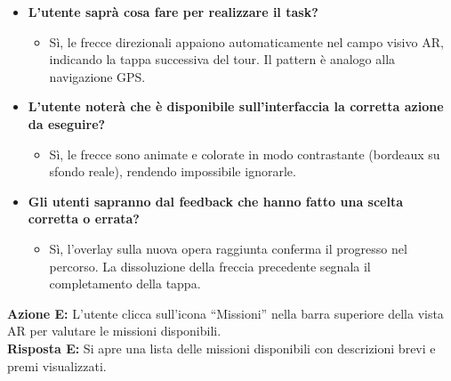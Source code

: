 \begin{itemize}[nosep, leftmargin=1.6em]
    \item \textbf{L'utente saprà cosa fare per realizzare il task?}
    \begin{itemize}[nosep, leftmargin=1.6em]
        \item Sì, le frecce direzionali appaiono automaticamente nel campo visivo AR, indicando la tappa successiva del tour. Il pattern è analogo alla navigazione GPS.
    \end{itemize}
    \item \textbf{L'utente noterà che è disponibile sull'interfaccia la corretta azione da eseguire?}
    \begin{itemize}[nosep, leftmargin=1.6em]
        \item Sì, le frecce sono animate e colorate in modo contrastante (bordeaux su sfondo reale), rendendo impossibile ignorarle.
    \end{itemize}
    \item \textbf{Gli utenti sapranno dal feedback che hanno fatto una scelta corretta o errata?}
    \begin{itemize}[nosep, leftmargin=1.6em]
        \item Sì, l'overlay sulla nuova opera raggiunta conferma il progresso nel percorso. La dissoluzione della freccia precedente segnala il completamento della tappa.
    \end{itemize}
\end{itemize}

\vspace{0.3cm}
\noindent\textbf{Azione E:} L'utente clicca sull'icona ``Missioni'' nella barra superiore della vista AR per valutare le missioni disponibili.\\
\textbf{Risposta E:} Si apre una lista delle missioni disponibili con descrizioni brevi e premi visualizzati.

